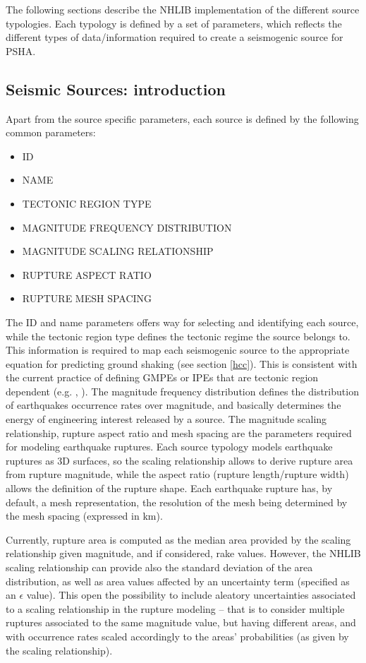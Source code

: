 \documentclass[11pt,a4paper,headings=small,dvips]{scrartcl}
\begin{document}
The following sections describe the NHLIB implementation of the 
different source typologies. Each typology is defined by a 
set of parameters, which reflects the different types of data/information 
required to create a seismogenic source for PSHA. 

\subsection{Seismic Sources: introduction}
Apart from the source specific parameters, each source is defined by 
the following common parameters:
%
\begin{itemize}
\item ID
\item NAME
\item TECTONIC REGION TYPE
\item MAGNITUDE FREQUENCY DISTRIBUTION
\item MAGNITUDE SCALING RELATIONSHIP
\item RUPTURE ASPECT RATIO
\item RUPTURE MESH SPACING
\end{itemize}
% 
The ID and name parameters offers way for selecting and identifying 
each source, while the tectonic region type defines the tectonic 
regime the source belongs to. 
This information is required to map each seismogenic source to the
appropriate equation for predicting ground shaking (see section 
\ref{hcc}). This is consistent with the current practice of defining 
GMPEs or IPEs that are tectonic region dependent (e.g. \cite{zhao2006}, 
\cite{campbell2003SCR}). The magnitude frequency distribution defines 
the distribution of earthquakes occurrence rates over magnitude, and 
basically determines the energy of engineering interest released 
by a source. 
The magnitude scaling relationship, rupture aspect ratio and mesh 
spacing are the parameters required for modeling earthquake ruptures. 
Each source typology models earthquake ruptures as 3D surfaces, so the 
scaling relationship allows to derive rupture area from rupture 
magnitude, while the aspect ratio (rupture length/rupture width) 
allows the definition of the rupture shape. Each earthquake rupture 
has, by default, a mesh representation, the resolution of the mesh
being determined by the mesh spacing (expressed in km).

Currently, rupture area is computed as the median area provided by 
the scaling relationship given magnitude, and if considered, rake 
values. However, the NHLIB scaling relationship can provide also the 
standard deviation of the area distribution, as well as area values 
affected by an uncertainty term (specified as an $\epsilon$ value). 
This open the possibility to include aleatory uncertainties associated 
to a scaling relationship in the rupture modeling -- that is to consider
multiple ruptures associated to the same magnitude value, but having 
different areas, and with occurrence rates scaled accordingly to the 
areas' probabilities (as given by the scaling relationship).
\end{document}
